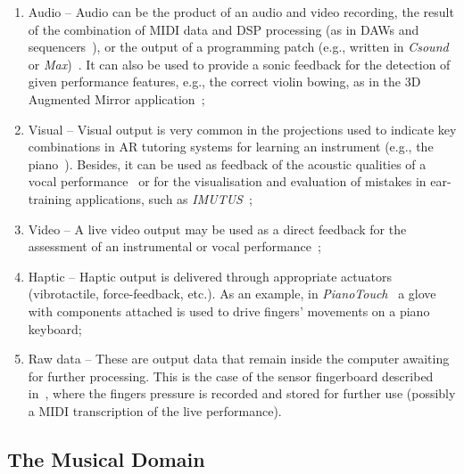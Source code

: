 \documentclass[journal]{IEEEtran}
\newcommand{\node}[1]{{\fontfamily{cmss}\selectfont #1}}
\begin{document}
\begin{enumerate}[label=1.\arabic*.,leftmargin=0.7cm,listparindent=-\leftmargin, start=0]
\begin{enumerate}[label=1.2.\arabic*.,leftmargin=0.9cm,listparindent=-\leftmargin, start=0]
\item \node{Audio} -- Audio can be the product of an audio and video recording, the result of the combination of MIDI data and DSP processing (as in DAWs and sequencers~\cite{gall2005music}), or the output of a programming patch (e.g., written in \textit{Csound} or  \textit{Max})~\cite{manzo2016max}. It can also be used to provide a sonic feedback for the detection of given performance features, e.g., the correct violin bowing, as in the 3D Augmented Mirror application~\cite{3D_Augmented_Mirror};
\item \node{Visual} -- Visual output is very common in the projections used to indicate key combinations in AR tutoring systems for learning an instrument (e.g., the piano~\cite{holokeys}). Besides, it can be used as feedback of the acoustic qualities of a vocal performance~\cite{welch2004voxed} or for the visualisation and evaluation of mistakes in ear-training applications, such as \textit{IMUTUS}~\cite{imutus};
\item \node{Video} -- A live video output may be used as a direct feedback for the assessment of an instrumental or vocal performance~\cite{digital_violin_tutor};
\item \node{Haptic} -- Haptic output is delivered through appropriate actuators (vibrotactile, force-feedback, etc.). As an example, in \textit{PianoTouch}~\cite{pianotouch} a glove with components attached is used to drive fingers' movements on a piano keyboard;
\item \node{Raw data} -- These are output data that remain inside the computer awaiting for further processing. This is the case of the sensor fingerboard described in~\cite{grosshauser}, where the fingers pressure is recorded and stored for further use (possibly a MIDI transcription of the live performance).
\end{enumerate}
\end{enumerate}


\subsection{The Musical Domain}
\label{subsec:MD}
\end{document}
